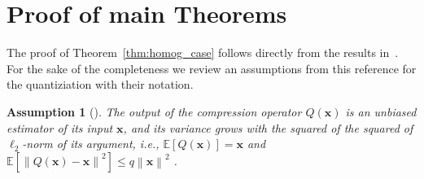 \documentclass{article}
\newtheorem{assumption}{Assumption}
\begin{document}
\newpage



\newpage

\appendix
\section{Proof of main Theorems}
The proof of Theorem~\ref{thm:homog_case} follows directly from the results in~\cite{haddadpour2020federated}. For the sake of the completeness we review an assumptions from this reference for the quantiziation with their notation.

\begin{assumption}[\cite{haddadpour2020federated}]\label{Assu:quant}
The output of the compression operator $Q(\mathbf{x})$ is an unbiased estimator of its input $\mathbf{x}$, and its variance grows with the squared of the squared of $\ell_2$-norm of its argument, i.e., $\mathbb{E}\left[Q(\mathbf{x})\right]=\mathbf{x}$ and $\mathbb{E}\left[\left\|Q(\mathbf{x})-\mathbf{x}\right\|^2\right]\leq q\left\|\mathbf{x}\right\|^2$ .
\end{assumption}
\end{document}
